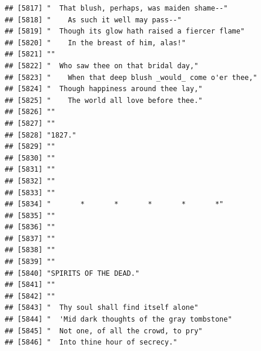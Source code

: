 \documentclass{article}\usepackage[]{graphicx}\usepackage[]{color}
\makeatletter
\newenvironment{kframe}{%
 \def\at@end@of@kframe{}%
 \ifinner\ifhmode%
  \def\at@end@of@kframe{\end{minipage}}%
  \begin{minipage}{\columnwidth}%
 \fi\fi%
 \def\FrameCommand##1{\hskip\@totalleftmargin \hskip-\fboxsep
 \colorbox{shadecolor}{##1}\hskip-\fboxsep
     \hskip-\linewidth \hskip-\@totalleftmargin \hskip\columnwidth}%
 \MakeFramed {\advance\hsize-\width
   \@totalleftmargin\z@ \linewidth\hsize
   \@setminipage}}%
 {\par\unskip\endMakeFramed%
 \at@end@of@kframe}
\newenvironment{knitrout}{}{} %
\makeatother
\begin{document}
\begin{knitrout}
\begin{kframe}
\begin{verbatim}
## [5817] "  That blush, perhaps, was maiden shame--"                                   
## [5818] "    As such it well may pass--"                                              
## [5819] "  Though its glow hath raised a fiercer flame"                               
## [5820] "    In the breast of him, alas!"                                             
## [5821] ""                                                                            
## [5822] "  Who saw thee on that bridal day,"                                          
## [5823] "    When that deep blush _would_ come o'er thee,"                            
## [5824] "  Though happiness around thee lay,"                                         
## [5825] "    The world all love before thee."                                         
## [5826] ""                                                                            
## [5827] ""                                                                            
## [5828] "1827."                                                                       
## [5829] ""                                                                            
## [5830] ""                                                                            
## [5831] ""                                                                            
## [5832] ""                                                                            
## [5833] ""                                                                            
## [5834] "       *       *       *       *       *"                                    
## [5835] ""                                                                            
## [5836] ""                                                                            
## [5837] ""                                                                            
## [5838] ""                                                                            
## [5839] ""                                                                            
## [5840] "SPIRITS OF THE DEAD."                                                        
## [5841] ""                                                                            
## [5842] ""                                                                            
## [5843] "  Thy soul shall find itself alone"                                          
## [5844] "  'Mid dark thoughts of the gray tombstone"                                  
## [5845] "  Not one, of all the crowd, to pry"                                         
## [5846] "  Into thine hour of secrecy."                                               

\end{verbatim}
\end{kframe}
\end{knitrout}
\end{document}
